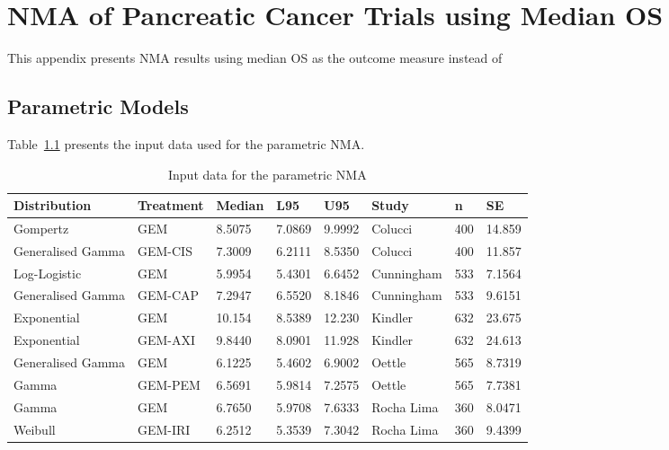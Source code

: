 \chapter{NMA of Pancreatic Cancer Trials using Median OS}

This appendix presents NMA results using median OS as the outcome measure instead of 


\section{Parametric Models}

Table~\ref{paramNMAInputs} presents the input data used for the parametric NMA. 

\begin{table}[h]
    \center
    \begin{tabular}{llllllll}
    \hline
    Distribution      & Treatment & Median  & L95    & U95     & Study      & n   & SE      \\ \hline
    Gompertz          & GEM       & 8.5075  & 7.0869 & 9.9992  & Colucci    & 400 & 14.859 \\
    Generalised Gamma & GEM-CIS   & 7.3009  & 6.2111 & 8.5350  & Colucci    & 400 & 11.857 \\
    Log-Logistic      & GEM       & 5.9954  & 5.4301 & 6.6452  & Cunningham & 533 & 7.1564  \\
    Generalised Gamma & GEM-CAP   & 7.2947  & 6.5520 & 8.1846  & Cunningham & 533 & 9.6151  \\
    Exponential       & GEM       & 10.154  & 8.5389 & 12.230  & Kindler    & 632 & 23.675 \\
    Exponential       & GEM-AXI   & 9.8440  & 8.0901 & 11.928  & Kindler    & 632 & 24.613 \\
    Generalised Gamma & GEM       & 6.1225  & 5.4602 & 6.9002  & Oettle     & 565 & 8.7319  \\
    Gamma             & GEM-PEM   & 6.5691  & 5.9814 & 7.2575  & Oettle     & 565 & 7.7381  \\
    Gamma             & GEM       & 6.7650  & 5.9708 & 7.6333  & Rocha Lima & 360 & 8.0471  \\
    Weibull           & GEM-IRI   & 6.2512  & 5.3539 & 7.3042  & Rocha Lima & 360 & 9.4399  \\ \hline
    \end{tabular}
    \caption{Input data for the parametric NMA}
    \label{paramNMAInputs}
\end{table}

